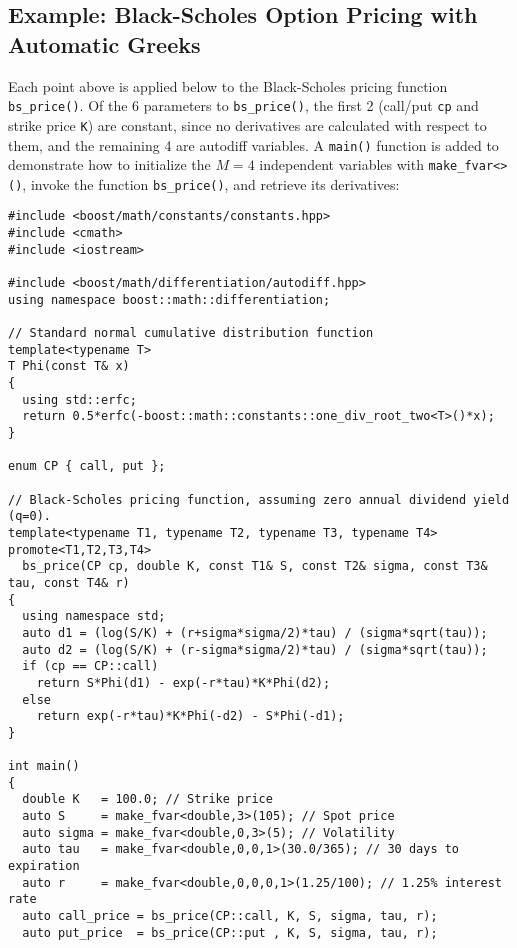 \documentclass{article}
\begin{document}
\subsection{Example: Black-Scholes Option Pricing with Automatic Greeks}
Each point above is applied below to the Black-Scholes pricing function {\tt bs\_price()}. Of the 6 parameters to
{\tt bs\_price()}, the first 2 (call/put {\tt cp} and strike price {\tt K}) are constant, since no derivatives are
calculated with respect to them, and the remaining 4 are autodiff variables. A {\tt main()} function is added to
demonstrate how to initialize the $M=4$ independent variables with {\tt make\_fvar<>()}, invoke the function
{\tt bs\_price()}, and retrieve its derivatives:

\begingroup
\fontsize{10pt}{10pt}\selectfont
\begin{verbatim}
#include <boost/math/constants/constants.hpp>
#include <cmath>
#include <iostream>

#include <boost/math/differentiation/autodiff.hpp>
using namespace boost::math::differentiation;

// Standard normal cumulative distribution function
template<typename T>
T Phi(const T& x)
{
  using std::erfc;
  return 0.5*erfc(-boost::math::constants::one_div_root_two<T>()*x);
}

enum CP { call, put };

// Black-Scholes pricing function, assuming zero annual dividend yield (q=0).
template<typename T1, typename T2, typename T3, typename T4>
promote<T1,T2,T3,T4>
  bs_price(CP cp, double K, const T1& S, const T2& sigma, const T3& tau, const T4& r)
{
  using namespace std;
  auto d1 = (log(S/K) + (r+sigma*sigma/2)*tau) / (sigma*sqrt(tau));
  auto d2 = (log(S/K) + (r-sigma*sigma/2)*tau) / (sigma*sqrt(tau));
  if (cp == CP::call)
    return S*Phi(d1) - exp(-r*tau)*K*Phi(d2);
  else
    return exp(-r*tau)*K*Phi(-d2) - S*Phi(-d1);
}

int main()
{
  double K   = 100.0; // Strike price
  auto S     = make_fvar<double,3>(105); // Spot price
  auto sigma = make_fvar<double,0,3>(5); // Volatility
  auto tau   = make_fvar<double,0,0,1>(30.0/365); // 30 days to expiration
  auto r     = make_fvar<double,0,0,0,1>(1.25/100); // 1.25% interest rate
  auto call_price = bs_price(CP::call, K, S, sigma, tau, r);
  auto put_price  = bs_price(CP::put , K, S, sigma, tau, r);


\end{verbatim}
\end{document}
